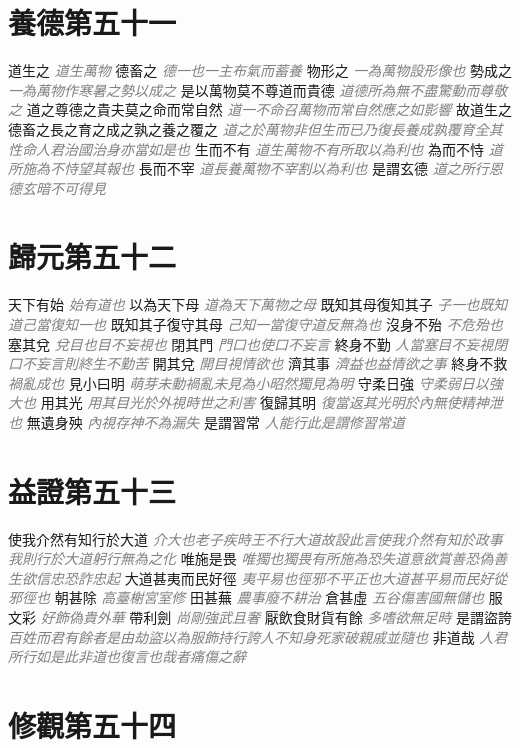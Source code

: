 \documentclass[a4paper,zihao=-4,oneside,landscape,UTF8]{ctexart}
\newcommand{\zhushi}[1]{\scriptsize{\textit{\textcolor{gray}{#1}}}\normalsize}
\begin{document}
\section{養德第五十一}

道生之
\zhushi{道生萬物}
德畜之
\zhushi{德一也一主布氣而蓄養}
物形之
\zhushi{一為萬物設形像也}
勢成之
\zhushi{一為萬物作寒暑之勢以成之}
是以萬物莫不尊道而貴德
\zhushi{道德所為無不盡驚動而尊敬之}
道之尊德之貴夫莫之命而常自然
\zhushi{道一不命召萬物而常自然應之如影響}
故道生之德畜之長之育之成之孰之養之覆之
\zhushi{道之於萬物非但生而已乃復長養成孰覆育全其性命人君治國治身亦當如是也}
生而不有
\zhushi{道生萬物不有所取以為利也}
為而不恃
\zhushi{道所施為不恃望其報也}
長而不宰
\zhushi{道長養萬物不宰割以為利也}
是謂玄德
\zhushi{道之所行恩德玄暗不可得見}


\section{歸元第五十二}

天下有始
\zhushi{始有道也}
以為天下母
\zhushi{道為天下萬物之母}
既知其母復知其子
\zhushi{子一也既知道己當復知一也}
既知其子復守其母
\zhushi{己知一當復守道反無為也}
沒身不殆
\zhushi{不危殆也}
塞其兌
\zhushi{兌目也目不妄視也}
閉其門
\zhushi{門口也使口不妄言}
終身不勤
\zhushi{人當塞目不妄視閉口不妄言則終生不勤苦}
開其兌
\zhushi{開目視情欲也}
濟其事
\zhushi{濟益也益情欲之事}
終身不救
\zhushi{禍亂成也}
見小曰明
\zhushi{萌芽未動禍亂未見為小昭然獨見為明}
守柔日強
\zhushi{守柔弱日以強大也}
用其光
\zhushi{用其目光於外視時世之利害}
復歸其明
\zhushi{復當返其光明於內無使精神泄也}
無遺身殃
\zhushi{內視存神不為漏失}
是謂習常
\zhushi{人能行此是謂修習常道}


\section{益證第五十三}

使我介然有知行於大道
\zhushi{介大也老子疾時王不行大道故設此言使我介然有知於政事我則行於大道躬行無為之化}
唯施是畏
\zhushi{唯獨也獨畏有所施為恐失道意欲賞善恐偽善生欲信忠恐詐忠起}
大道甚夷而民好徑
\zhushi{夷平易也徑邪不平正也大道甚平易而民好從邪徑也}
朝甚除
\zhushi{高臺榭宮室修}
田甚蕪
\zhushi{農事廢不耕治}
倉甚虛
\zhushi{五谷傷害國無儲也}
服文彩
\zhushi{好飾偽貴外華}
帶利劍
\zhushi{尚剛強武且奢}
厭飲食財貨有餘
\zhushi{多嗜欲無足時}
是謂盜誇
\zhushi{百姓而君有餘者是由劫盜以為服飾持行誇人不知身死家破親戚並隨也}
非道哉
\zhushi{人君所行如是此非道也復言也哉者痛傷之辭}


\section{修觀第五十四}
\end{document}
